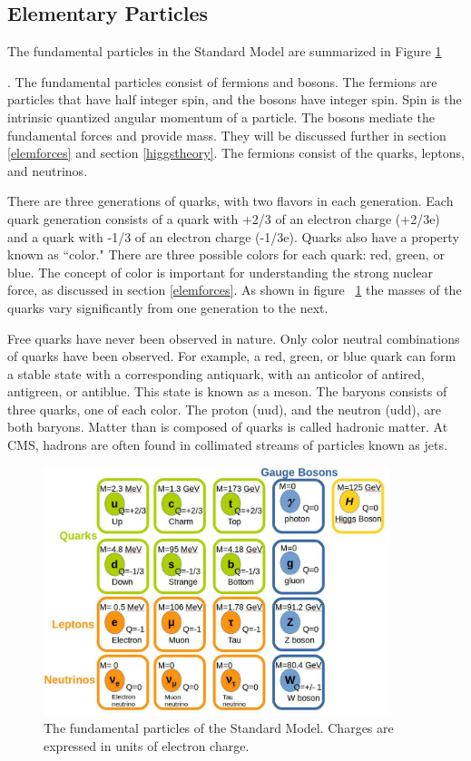 \documentclass[oneside, letterpaper, oldfontcommands]{memoir}
\begin{document}
\subsection{Elementary Particles}\label{elemparticles}
\qquad The fundamental particles in the Standard Model are summarized in Figure \ref{fig:SMParticles} 

. The fundamental particles consist of fermions and bosons. The fermions are particles that have half integer spin, and the bosons have integer spin. Spin is the intrinsic quantized angular momentum of a particle. The bosons mediate the fundamental forces and provide mass. They will be discussed further in section \ref{elemforces} and section \ref{higgstheory}. The fermions consist of the quarks, leptons, and neutrinos. 

\qquad There are three generations of quarks, with two flavors in each generation. Each quark generation consists of a quark with +2/3 of an electron charge (+2/3e) and a quark with -1/3 of an electron charge (-1/3e). Quarks also have a property known as ``color." There are three possible colors for each quark: red, green, or blue. The concept of color is important for understanding the strong nuclear force, as discussed in section \ref{elemforces}. As shown in figure ~\ref{fig:SMParticles} the masses of the quarks vary significantly from one generation to the next.

\qquad Free quarks have never been observed in nature. Only color neutral combinations of quarks have been observed. For example, a red, green, or blue quark can form a stable state with a corresponding antiquark, with an anticolor of antired, antigreen, or antiblue. This state is known as a meson. The baryons consists of three quarks, one of each color. The proton (uud), and the neutron (udd), are both baryons. Matter than is composed of quarks is called hadronic matter. At CMS, hadrons are often found in collimated streams of particles known as jets. 

\begin{figure}[here]
\includegraphics[width=0.9\textwidth]{StandardModel.pdf}
\caption{The fundamental particles of the Standard Model. Charges are expressed in units of electron charge.\cite{Agashe:2014kda} }
\label{fig:SMParticles}
\end{figure}
\end{document}
